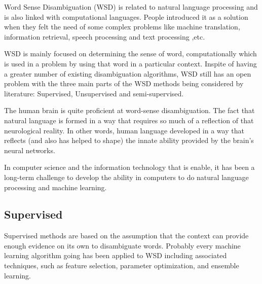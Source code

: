 Word Sense Disambiguation (WSD) is related to natural language processing and is also linked with computational languages. 
People introduced it as a solution when they felt the need of some complex problems like machine translation, information retrieval, speech processing and text processing ,etc. 

WSD is mainly focused on determining the sense of word, computationally which is used in a problem by using that word in a particular context. 
Inspite of having a greater number of existing disambiguation algorithms, WSD still has an open problem with the three main parts of the WSD methods being considered by literature: Supervised, Unsupervised and semi-supervised. 

The human brain is quite proficient at word-sense disambiguation. 
The fact that natural language is formed in a way that requires so much of a reflection of that neurological reality. 
In other words, human language developed in a way that reflects (and also has helped to shape) the innate ability provided by the brain's neural networks. 

In computer science and the information technology that is enable, it has been a long-term challenge to develop the ability in computers to do natural language processing and machine learning. 

\subsection*{Supervised}

Supervised methods are based on the assumption that the context can provide enough evidence on its own to disambiguate words. Probably every machine learning algorithm going has been applied to WSD including associated techniques, such as feature selection, parameter optimization, and ensemble learning.

